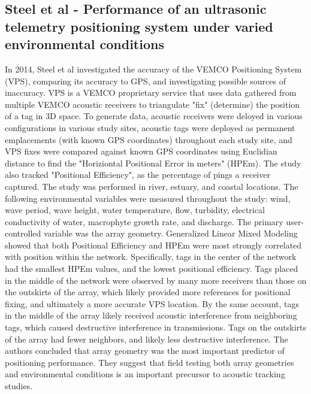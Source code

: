 \subsection {Steel et al - Performance of an ultrasonic telemetry positioning system under varied environmental conditions}
In 2014, Steel et al\cite{Steel2014} investigated the accuracy of the VEMCO Positioning System (VPS), comparing its accuracy to GPS, and investigating possible sources of inaccuracy.  VPS is a VEMCO proprietary service that uses data gathered from multiple VEMCO acoustic receivers to triangulate "fix" (determine) the position of a tag in 3D space.  To generate data, acoustic receivers were deloyed in various configurations in various study sites, acoustic tags were deployed as permanent emplacements (with known GPS coordinates) throughout each study site, and VPS fixes were compared against known GPS coordinates using Euclidian distance to find the "Horiziontal Positional Error in meters" (HPEm).  The study also tracked "Positional Efficiency", as the percentage of pings a receiver captured.  The study was performed in river, estuary, and coastal locations.  The following environmental variables were measured throughout the study: wind, wave period, wave height, water temperature, flow, turbidity, electrical conductivity of water, macrophyte growth rate, and discharge.  The primary user-controlled variable was the array geometry.  Generalized Linear Mixed Modeling showed that both Positional Efficiency and HPEm were most strongly correlated with position within the network.  Specifically, tags in the center of the network had the smallest HPEm values, and the lowest positional efficiency.  Tags placed in the middle of the network were observed by many more receivers than those on the outskirts of the array, which likely provided more references for positional fixing, and ultimately a more accurate VPS location.  By the same account, tags in the middle of the array likely received acoustic interference from neighboring tags, which  caused destructive interference in transmissions.  Tags on the outskirts of the array had fewer neighbors, and likely less destructive interference.  The authors concluded that array geometry was the most important predictor of positioning performance. They suggest that field testing both array geometries and environmental conditions is an important precursor to acoustic tracking studies.



